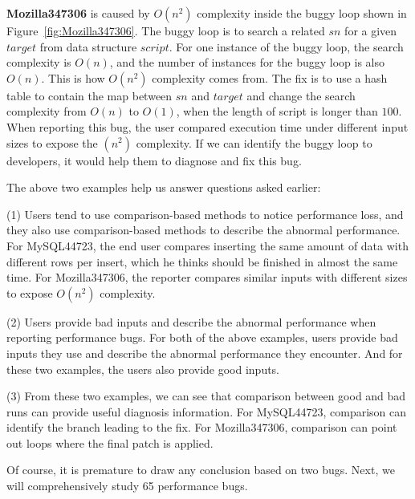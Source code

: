 {\bf Mozilla347306} is caused by $O(n^2)$ complexity inside the buggy loop shown in Figure~\ref{fig:Mozilla347306}. 
The buggy loop is to search a related $sn$ for a given $target$ from data structure $script$. 
For one instance of the buggy loop, the search complexity is $O(n)$, and the number of instances for the buggy loop is also $O(n)$. 
This is how $O(n^2)$ complexity comes from. 
The fix is to use a hash table to contain the map between $sn$ and $target$ and change the search complexity from $O(n)$ to $O(1)$, when the length of script is longer than $100$.  
When reporting this bug, the user compared execution time under different input sizes to expose the $(n^2)$ complexity. 
If we can identify the buggy loop to developers, it would help them to diagnose and fix this bug. 


The above two examples help us answer questions asked earlier:

(1) Users tend to use comparison-based methods to notice performance loss, 
and they also use comparison-based methods to describe the abnormal performance. 
For MySQL44723, the end user compares inserting the same amount of data with different rows per insert,  
which he thinks should be finished in almost the same time. 
For Mozilla347306, the reporter compares similar inputs with different sizes to expose $O(n^2)$ complexity. 

(2) Users provide bad inputs and describe the abnormal performance 
when reporting performance bugs. For both of the above examples, 
users provide bad inputs they use and describe the abnormal performance they encounter. 
And for these two examples, the users also provide good inputs. 

(3) From these two examples, we can see that comparison between 
good and bad runs can provide useful diagnosis information. 
For MySQL44723, comparison can identify the branch leading to the fix. 
For Mozilla347306, comparison can point out loops where the final patch is applied. 

Of course, it is premature to draw any conclusion based on two
bugs. Next, we will comprehensively study 65 performance bugs.

